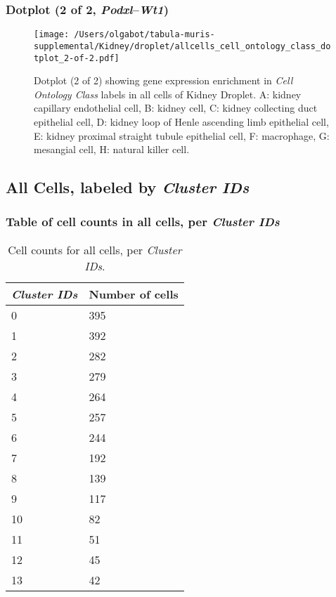 \clearpage

\subsubsection{Dotplot (2 of 2, \emph{Podxl}--\emph{Wt1})}
\begin{figure}[h]
\centering
\texttt{[image: /Users/olgabot/tabula-muris-supplemental/Kidney/droplet/allcells\_cell\_ontology\_class\_dotplot\_2-of-2.pdf]}

\caption{ Dotplot (2 of 2)  showing gene expression enrichment in \emph{Cell Ontology Class} labels in all cells of Kidney Droplet. A: kidney capillary endothelial cell, B: kidney cell, C: kidney collecting duct epithelial cell, D: kidney loop of Henle ascending limb epithelial cell, E: kidney proximal straight tubule epithelial cell, F: macrophage, G: mesangial cell, H: natural killer cell.}
\end{figure}


\clearpage

\subsection{All Cells, labeled by \emph{Cluster IDs}}
\subsubsection{Table of cell counts in all cells, per \emph{Cluster IDs}}\begin{table}[h]
\centering
\label{my-label}
\begin{tabular}{@{}ll@{}}
\toprule

\emph{Cluster IDs}& Number of cells \\ \midrule
0 & 395 \\

1 & 392 \\

2 & 282 \\

3 & 279 \\

4 & 264 \\

5 & 257 \\

6 & 244 \\

7 & 192 \\

8 & 139 \\

9 & 117 \\

10 & 82 \\

11 & 51 \\

12 & 45 \\

13 & 42 \\
\bottomrule
\end{tabular}
\caption{Cell counts for all cells, per \emph{Cluster IDs}.}
\end{table}

